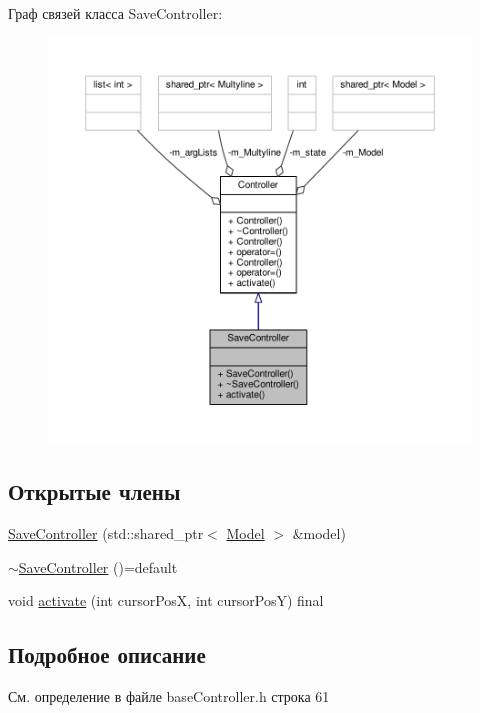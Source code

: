 Граф связей класса Save\-Controller\-:
\nopagebreak
\begin{figure}[H]
\begin{center}
\leavevmode
\includegraphics[width=350pt]{class_save_controller__coll__graph}
\end{center}
\end{figure}
\subsection*{Открытые члены}
\begin{DoxyCompactItemize}
\item 
\hyperlink{class_save_controller_aa8039a76832d89da06fbf5e63ba8c7e1}{Save\-Controller} (std\-::shared\-\_\-ptr$<$ \hyperlink{class_model}{Model} $>$ \&model)
\item 
\hyperlink{class_save_controller_ac4a37f1855232e795d306f1a8038c85b}{$\sim$\-Save\-Controller} ()=default
\item 
void \hyperlink{class_save_controller_a82d91ea99368d4cbce96a24d988a8c2b}{activate} (int cursor\-Pos\-X, int cursor\-Pos\-Y) final
\end{DoxyCompactItemize}


\subsection{Подробное описание}


См. определение в файле base\-Controller.\-h строка 61



